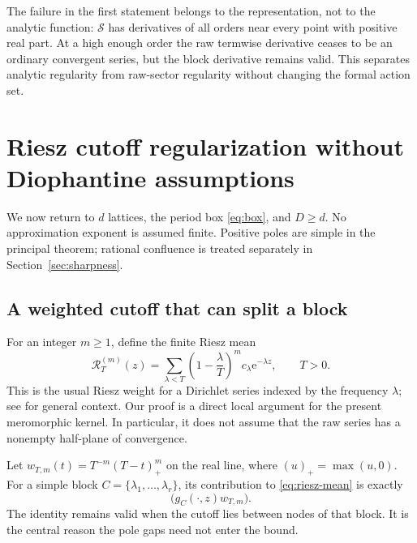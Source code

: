 \documentclass[11pt,a4paper]{article}
\numberwithin{equation}{section}
\theoremstyle{definition}
\theoremstyle{remark}
\newcommand{\e}{\mathrm e}
\newcommand{\Ssum}{\mathcal S}
\newcommand{\Riesz}{\mathcal R}
\begin{document}
The failure in the first statement belongs to the representation, not
to the analytic function: $\Ssum$ has derivatives of all orders near
every point with positive real part. At a high enough order the raw
termwise derivative ceases to be an ordinary convergent series, but the
block derivative remains valid. This separates analytic regularity from
raw-sector regularity without changing the formal action set.

\section{Riesz cutoff regularization without Diophantine assumptions}
\label{sec:riesz}
We now return to $d$ lattices, the period box \eqref{eq:box}, and
$D\ge d$. No approximation exponent is assumed finite. Positive poles
are simple in the principal theorem; rational confluence is treated
separately in Section~\ref{sec:sharpness}.

\subsection{A weighted cutoff that can split a block}
For an integer $m\ge1$, define the finite Riesz mean
\begin{equation}
 \Riesz_T^{(m)}(z)=\sum_{\lambda<T}
        \left(1-\frac{\lambda}{T}\right)^m c_\lambda\e^{-\lambda z},
 \qquad T>0.
 \label{eq:riesz-mean}
\end{equation}
This is the usual Riesz weight for a Dirichlet series indexed by the
frequency $\lambda$; see \cite{defant-schoolmann} for general context.
Our proof is a direct local argument for the present meromorphic
kernel. In particular, it does not assume that the raw series has a
nonempty half-plane of convergence.

Let $w_{T,m}(t)=T^{-m}(T-t)_+^m$ on the real line, where
$(u)_+=\max(u,0)$. For a simple block $C=\{\lambda_1,\ldots,\lambda_r\}$,
its contribution to \eqref{eq:riesz-mean} is exactly
\begin{equation}
 [\lambda_1,\ldots,\lambda_r]\bigl(g_C(\cdot,z)w_{T,m}\bigr).
 \label{eq:partial-block}
\end{equation}
The identity remains valid when the cutoff lies between nodes of that
block. It is the central reason the pole gaps need not enter the bound.
\end{document}
